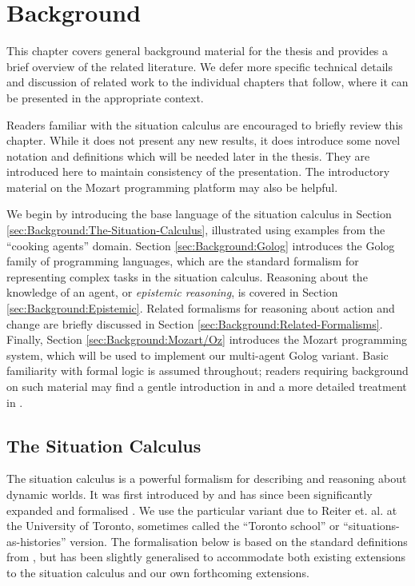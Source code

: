 

\chapter{Background}

\label{ch:background}

This chapter covers general background material for the thesis and
provides a brief overview of the related literature. We defer more
specific technical details and discussion of related work to the individual
chapters that follow, where it can be presented in the appropriate
context.

Readers familiar with the situation calculus are encouraged to briefly
review this chapter. While it does not present any new results, it
does introduce some novel notation and definitions which will be needed
later in the thesis. They are introduced here to maintain consistency
of the presentation. The introductory material on the Mozart programming
platform may also be helpful.

We begin by introducing the base language of the situation calculus
in Section \ref{sec:Background:The-Situation-Calculus}, illustrated
using examples from the {}``cooking agents'' domain. Section \ref{sec:Background:Golog}
introduces the Golog family of programming languages, which are the
standard formalism for representing complex tasks in the situation
calculus. Reasoning about the knowledge of an agent, or \emph{epistemic
reasoning}, is covered in Section \ref{sec:Background:Epistemic}.
Related formalisms for reasoning about action and change are briefly
discussed in Section \ref{sec:Background:Related-Formalisms}. Finally,
Section \ref{sec:Background:Mozart/Oz} introduces the Mozart programming
system, which will be used to implement our multi-agent Golog variant.
Basic familiarity with formal logic is assumed throughout; readers
requiring background on such material may find a gentle introduction
in \citep{kelly96logic} and a more detailed treatment in \citep{fitting96fol_book}.


\section{The Situation Calculus\label{sec:Background:The-Situation-Calculus}}

The situation calculus is a powerful formalism for describing and
reasoning about dynamic worlds. It was first introduced by \citet{McCHay69sitcalc}
and has since been significantly expanded and formalised \citep{reiter91frameprob,pirri99contributions_sitcalc}.
We use the particular variant due to Reiter et. al. at the University
of Toronto, sometimes called the {}``Toronto school'' or {}``situations-as-histories''
version. The formalisation below is based on the standard definitions
from \citep{levesque98sc_foundations,pirri99contributions_sitcalc,reiter01kia},
but has been slightly generalised to accommodate both existing extensions
to the situation calculus and our own forthcoming extensions.

